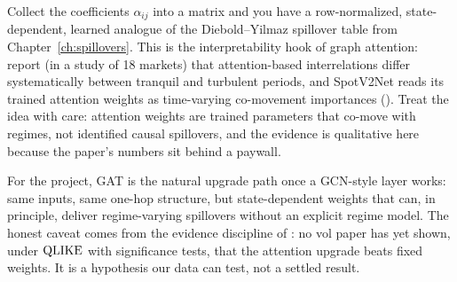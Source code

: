 \begin{keyidea}
Collect the coefficients $\alpha_{ij}$ into a matrix and you have a row-normalized, state-dependent, learned analogue of the Diebold--Yilmaz spillover table from Chapter~\ref{ch:spillovers}. This is the interpretability hook of graph attention: \citet{GongWangZhouXie2025} report (in a study of 18 markets) that attention-based interrelations differ systematically between tranquil and turbulent periods, and SpotV2Net reads its trained attention weights as time-varying co-movement importances (). Treat the idea with care: attention weights are trained parameters that co-move with regimes, not identified causal spillovers, and the \citet{GongWangZhouXie2025} evidence is qualitative here because the paper's numbers sit behind a paywall.
\end{keyidea}

\begin{projectconnection}
For the project, GAT is the natural upgrade path once a GCN-style layer works: same inputs, same one-hop structure, but state-dependent weights that can, in principle, deliver regime-varying spillovers without an explicit regime model. The honest caveat comes from the evidence discipline of : no vol paper has yet shown, under $\operatorname{QLIKE}$ with significance tests, that the attention upgrade beats fixed weights. It is a hypothesis our data can test, not a settled result.
\end{projectconnection}

